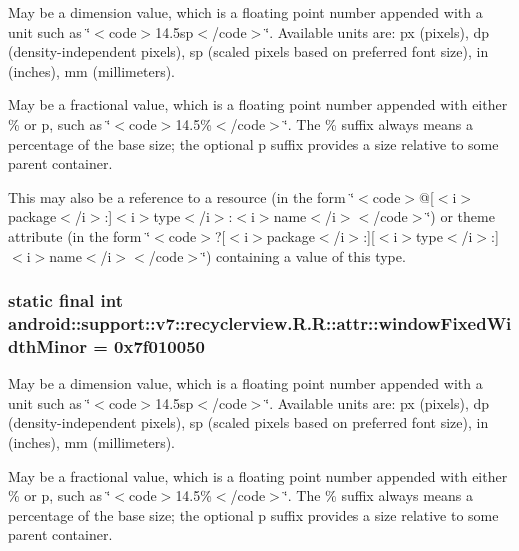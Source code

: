 May be a dimension value, which is a floating point number appended with a unit such as \char`\"{}$<$code$>$14.5sp$<$/code$>$\char`\"{}. Available units are: px (pixels), dp (density-independent pixels), sp (scaled pixels based on preferred font size), in (inches), mm (millimeters). 

May be a fractional value, which is a floating point number appended with either \% or p, such as \char`\"{}$<$code$>$14.5\%$<$/code$>$\char`\"{}. The \% suffix always means a percentage of the base size; the optional p suffix provides a size relative to some parent container. 

This may also be a reference to a resource (in the form \char`\"{}$<$code$>$@\mbox{[}$<$i$>$package$<$/i$>$:\mbox{]}$<$i$>$type$<$/i$>$:$<$i$>$name$<$/i$>$$<$/code$>$\char`\"{}) or theme attribute (in the form \char`\"{}$<$code$>$?\mbox{[}$<$i$>$package$<$/i$>$:\mbox{]}\mbox{[}$<$i$>$type$<$/i$>$:\mbox{]}$<$i$>$name$<$/i$>$$<$/code$>$\char`\"{}) containing a value of this type. \hypertarget{classandroid_1_1support_1_1v7_1_1recyclerview_1_1_r_1_1attr_240f579b402c06de047efc02a571359b}{
\subsubsection[{windowFixedWidthMinor}]{\setlength{\rightskip}{0pt plus 5cm}static final int android::support::v7::recyclerview.R.R::attr::windowFixedWidthMinor = 0x7f010050}}
\label{classandroid_1_1support_1_1v7_1_1recyclerview_1_1_r_1_1attr_240f579b402c06de047efc02a571359b}


May be a dimension value, which is a floating point number appended with a unit such as \char`\"{}$<$code$>$14.5sp$<$/code$>$\char`\"{}. Available units are: px (pixels), dp (density-independent pixels), sp (scaled pixels based on preferred font size), in (inches), mm (millimeters). 

May be a fractional value, which is a floating point number appended with either \% or p, such as \char`\"{}$<$code$>$14.5\%$<$/code$>$\char`\"{}. The \% suffix always means a percentage of the base size; the optional p suffix provides a size relative to some parent container. 

